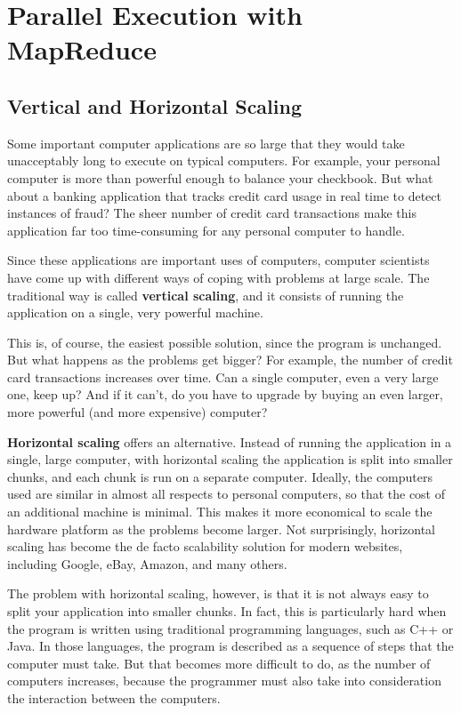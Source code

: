 \chapter{Parallel Execution with MapReduce}

\section{Vertical and Horizontal Scaling}

Some important computer applications are so large that they would take
unacceptably long to execute on typical computers.  For
example, your personal computer is more than powerful enough
to balance your checkbook.  But what about a banking
application that tracks credit card usage in real time to
detect instances of fraud?  The sheer number of credit card
transactions make this application far too time-consuming for any
personal computer to handle.

Since these applications are important uses of computers,
computer scientists have come up with different ways of coping
with problems at large scale.  The traditional way is called
\textbf{vertical scaling}, and it consists of running the
application on a single, very powerful machine.

This is, of course, the easiest possible solution,
since the program is unchanged. But what happens as the
problems get bigger?  For example, the number of credit card
transactions increases over time.  Can a single computer, even
a very large one, keep up?  And if it can't, do you have to
upgrade by buying an even larger, more powerful (and more
expensive) computer?

\textbf{Horizontal scaling} offers an alternative.  Instead of
running the application in a single, large computer, with
horizontal scaling the application is split into smaller
chunks, and each chunk is run on a separate computer.
Ideally, the computers used are similar in almost all respects
to personal computers, so that the cost of an additional
machine is minimal.  This makes it more economical to scale the
hardware platform as the problems become larger.  Not
surprisingly, horizontal scaling has become the de facto
scalability solution for modern websites, including Google,
eBay, Amazon, and many others.

The problem with horizontal scaling, however, is that it is
not always easy to split your application into smaller
chunks.  In fact, this is particularly hard when the program
is written using traditional programming languages, such as
C++ or Java.  In those languages, the program is described as
a sequence of steps that the computer must take.  But that
becomes more difficult to do, as the number of computers
increases, because the programmer must also take into
consideration the interaction between the computers.

